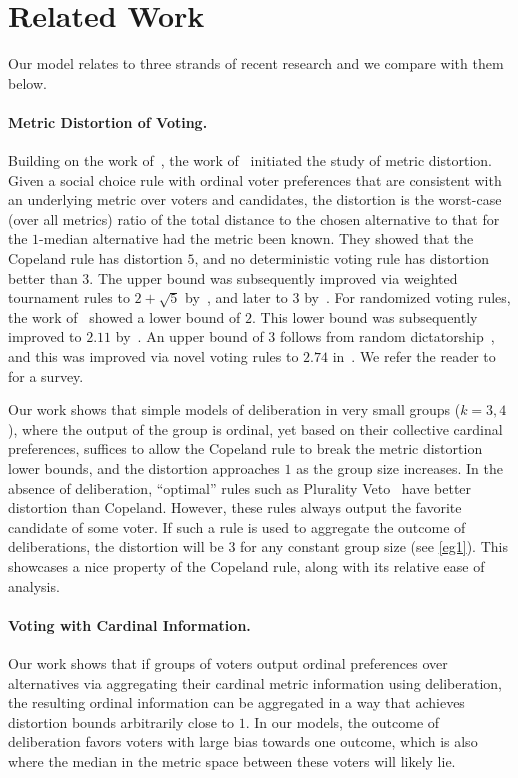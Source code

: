 \section{Related Work}
Our model relates to three strands of recent research and we compare with them below.

\paragraph{Metric Distortion of Voting.} Building on the work of~\cite{ProcacciaR06}, the work of~\cite{AnshelevichBEPS18} initiated the study of metric distortion. Given a social choice rule with ordinal voter preferences that are consistent with an underlying metric over voters and candidates, the distortion is the worst-case (over all metrics) ratio of the total distance to the chosen alternative to that for the $1$-median alternative had the metric been known. They showed that the Copeland rule has distortion $5$, and no deterministic voting rule has distortion better than $3$.  The upper bound was subsequently improved via weighted tournament rules to $2 + \sqrt{5}$ by~\cite{MunagalaW19,Kempe_2020}, and later to $3$ by~\cite{Gkatzelis0020,Kizilkaya022}.  For randomized voting rules, the work of~\cite{AnshelevichP17} showed a lower bound of $2$. This lower bound was subsequently improved to $2.11$ by~\cite{CharikarR22}. An upper bound of $3$ follows from random dictatorship~\cite{AnshelevichP17}, and this was improved via novel voting rules to $2.74$ in~\cite{CharikarWRW24}. We refer the reader to~\cite{AnshelevichFSV21} for a survey.

Our work shows that simple models of deliberation in very small groups ($k=3,4$), where the output of the group is ordinal, yet based on their collective cardinal preferences, suffices to allow the Copeland rule to break the metric distortion lower bounds, and the distortion approaches $1$ as the group size increases. In the absence of deliberation, ``optimal'' rules such as Plurality Veto~\cite{Kizilkaya022} have better distortion than Copeland. However, these rules always output the favorite candidate of some voter. If such a rule is used to aggregate the outcome of deliberations, the distortion will be $3$ for any constant group size (see \cref{eg1}). This showcases a nice property of the Copeland rule, along with its relative ease of analysis.

\paragraph{Voting with Cardinal Information.} Our work shows that if groups of voters output ordinal preferences over alternatives via aggregating their cardinal metric information using deliberation, the resulting ordinal information can be aggregated in a way that achieves distortion bounds arbitrarily close to $1$. In our models, the outcome of deliberation favors voters with large bias towards one outcome, which is also where the median in the metric space between these voters will likely lie. 

